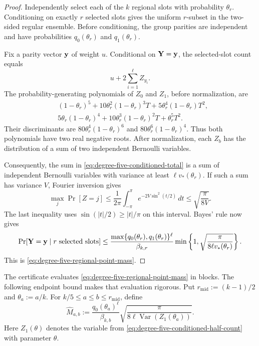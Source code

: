 \begin{proof}
Independently select each of the $k$ regional slots with probability $\theta_r$.
Conditioning on exactly $r$ selected slots gives the uniform $r$-subset in
the two-sided regular ensemble.  Before conditioning, the group parities are
independent and have probabilities $q_0(\theta_r)$ and $q_1(\theta_r)$.

Fix a parity vector $\mathbf y$ of weight $u$.  Conditional on $\mathbf Y=\mathbf y$, the
selected-slot count equals
\begin{equation}
 u+2\sum_{i=1}^{\ell} Z_{y_i}.
 \label{eq:degree-five-conditioned-total}
\end{equation}
The probability-generating polynomials of $Z_0$ and $Z_1$, before
normalization, are
\begin{align*}
 &(1-\theta_r)^5+10\theta_r^2(1-\theta_r)^3T
   +5\theta_r^4(1-\theta_r)T^2,\\
 &5\theta_r(1-\theta_r)^4+10\theta_r^3(1-\theta_r)^2T
   +\theta_r^5T^2.
\end{align*}
Their discriminants are $80\theta_r^4(1-\theta_r)^6$ and
$80\theta_r^6(1-\theta_r)^4$.  Thus both polynomials have two real negative
roots.
After normalization, each $Z_b$ has the distribution of a sum of two
independent Bernoulli variables.

Consequently, the sum in \eqref{eq:degree-five-conditioned-total} is a sum
of independent Bernoulli variables with variance at least
$\ell v_*(\theta_r)$.  If such a sum has variance $V$, Fourier inversion gives
\begin{equation}
 \max_j\Pr[Z=j]
 \leq\frac1{2\pi}\int_{-\pi}^{\pi}
 e^{-2V\sin^2(t/2)}\,dt
 \leq\sqrt{\frac{\pi}{8V}}.
 \label{eq:poisson-binomial-local-mass}
\end{equation}
The last inequality uses $\sin(|t|/2)\geq |t|/\pi$ on this interval.
Bayes' rule now gives
\begin{equation*}
 \Pr[\mathbf Y=\mathbf y\mid\text{$r$ selected slots}]
 \leq
 \frac{\max\{q_0(\theta_r),q_1(\theta_r)\}^{\ell}}{\beta_{k,r}}
 \min\left\{1,\sqrt{\frac{\pi}{8\ell v_*(\theta_r)}}\right\}.
\end{equation*}
This is \eqref{eq:degree-five-regional-point-mass}.
\end{proof}

The certificate evaluates \eqref{eq:degree-five-regional-point-mass} in
blocks.  The following endpoint bound makes that evaluation rigorous.  Put
$r_{\mathrm{mid}}:=(k-1)/2$ and $\theta_a:=a/k$.  For
$k/5\leq a\leq b\leq r_{\mathrm{mid}}$, define
\begin{equation}
 \widehat M_{a,b}:=
 \frac{q_0(\theta_a)^\ell}{\beta_{k,b}}
 \sqrt{\frac{\pi}{8\ell\operatorname{Var}(Z_1(\theta_a))}}.
 \label{eq:degree-five-block-point-mass}
\end{equation}
Here $Z_1(\theta)$ denotes the variable from
\eqref{eq:degree-five-conditioned-half-count} with parameter $\theta$.


